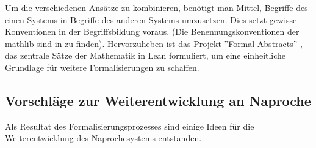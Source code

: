 \documentclass[a4paper,12pt]{scrartcl}
\begin{document}
Um die verschiedenen Ansätze zu kombinieren, benötigt man Mittel, Begriffe des einen Systems in Begriffe des anderen Systems umzusetzen. Dies setzt gewisse Konventionen in der Begriffsbildung voraus. (Die Benennungskonventionen der mathlib sind in \cite{bibtex.i} zu finden).
Hervorzuheben ist das Projekt ''Formal Abstracts'' \cite{bibtex.b}, das zentrale Sätze der Mathematik in Lean formuliert, um eine einheitliche Grundlage für weitere Formalisierungen zu schaffen.

\subsection{Vorschläge zur Weiterentwicklung an Naproche}

Als Resultat des Formalisierungsprozesses sind einige Ideen für die Weiterentwicklung des Naprochesystems entstanden.
\end{document}
